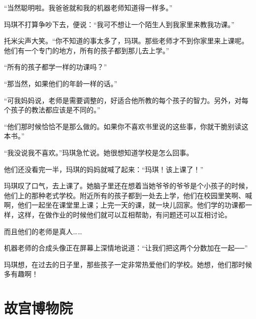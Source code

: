 \documentclass[12pt,UTF-8,openany]{ctexbook}
\begin{document}
\begin{Large}
    “当然聪明啦。我爸爸就和我的机器老师知道得一样多。”
    
    玛琪不打算争吵下去，便说：“我可不想让一个陌生人到我家里来教我功课。”
    
    托米尖声大笑。“你不知道的事太多了，玛琪。那些老师才不到你家里来上课呢。他们有一个专门的地方，所有的孩子都到那儿去上学。”
    
    “所有的孩子都学一样的功课吗？”
    
    “那当然，如果他们的年龄一样的话。”
    
    “可我妈妈说，老师是需要调整的，好适合他所教的每个孩子的智力。另外，对每个孩子的教法都应该是不同的。”
    
    “他们那时候恰恰不是那么做的。如果你不喜欢书里说的这些事，你就干脆别读这本书。”
    
    “我没说我不喜欢。”玛琪急忙说。她很想知道学校是怎么回事。
    
    他们还没看完一半，玛琪的妈妈就喊了起来：“玛琪！该上课了！”
    
    玛琪叹了口气，去上课了。她脑子里还在想着当她爷爷的爷爷是个小孩子的时候，他们上的那种老式学校。附近所有的孩子都到一处去上学，他们在校园里笑啊、喊啊，他们一起坐在课堂里上课；上完一天的课，就一块儿回家。他们学的功课都一样，这样，在做作业的时候他们就可以互相帮助，有问题还可以互相讨论。
    
    而且他们的老师是真人……
    
    机器老师的合成头像正在屏幕上深情地说道：“让我们把这两个分数加在一起──”
    
    玛琪想，在过去的日子里，那些孩子一定非常热爱他们的学校。她想，他们那时候多有趣啊！
    
\end{Large}

\chapter{故宫博物院}
\end{document}
